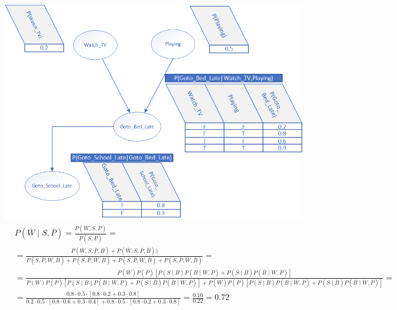 \documentclass[a4 paper]{article}
\begin{document}

    \\
        \includegraphics[width=\textwidth]{Exercise1.png}
    \\
        \small
        \begin{align*}
            &P(\overline{W} \mid  S , \overline{P}) = \frac{P(\overline{W},S,\overline{P})}{P(S,\overline{P})}=\\
            &=\frac{P(\overline{W},S,\overline{P},B)+P(\overline{W},S,\overline{P},\overline{B}))}
            {P(S,\overline{P},W,B)+P(S,\overline{P},\overline{W},B)+P(S,\overline{P},W,\overline{B})+P(S,\overline{P},\overline{W},\overline{B})}=\\
            &=\frac{P(\overline{W})P(\overline{P})[P(S \mid B)P(B \mid \overline{W},\overline{P})+P(S \mid \overline{B})P(\overline{B} \mid \overline{W},\overline{P})]}
            {P(W)P(\overline{P})[P(S \mid B)P(B \mid W,\overline{P}) + P(S \mid \overline{B})P(\overline{B} \mid W,\overline{P}) ] + P(\overline{W})P(\overline{P})[P(S \mid B)P(B \mid \overline{W},\overline{P}) + P(S \mid \overline{B})P(\overline{B} \mid \overline{W},\overline{P}) ]}=\\
            &=\frac{0.8 \cdot 0.5 \cdot [0.8 \cdot 0.2 + 0.3 \cdot 0.8]}{0.2 \cdot 0.5 \cdot [0.8 \cdot 0.6 + 0.3 \cdot 0.4] + 0.8 \cdot 0.5 \cdot [0.8 \cdot 0.2 + 0.3 \cdot 0.8]}= \frac{0.16}{0.22}= 0.\overline{72}
        \end{align*}
        \normalsize    
\newpage
{}
    
\end{document}
